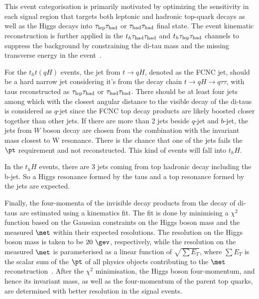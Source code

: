 This event categorisation is primarily motivated by optimizing the sensitivity in each signal region that targets both leptonic and hadronic top-quark
decays as well as the Higgs decays into $\tau_{\mathrm{lep}} \tau_{\mathrm{had}}$ or $\tau_{\mathrm{had}} \tau_{\mathrm{had}}$ final state.   
The event kinematic reconstruction is further applied in the $t_h\tau_{\mathrm{had}} \tau_{\mathrm{had}}$ and $t_h\tau_{\mathrm{lep}} \tau_{\mathrm{had}}$ channels to suppress the background by constraining the
di-tau mass and the missing transverse energy in the event~\cite{Chen:2015nta}. 

For the $t_ht(qH)$ events, the jet from $t\to qH$, denoted as the FCNC jet, should be a hard narrow jet considering it's from the
decay chain $t\to qH\to q\tau\tau$, with taus reconstructed as $\tau_{\mathrm{lep}} \tau_{\mathrm{had}}$ or $\tau_{\mathrm{had}} \tau_{\mathrm{had}}$.
There should be at least four jets among which with the closest angular distance to the visible decay of the di-taus
is considered as $q$-jet since the FCNC top decay products are likely boosted closer together than other jets. 
If there are more than 2 jets beside $q$-jet and $b$-jet, the jets from $W$ boson decay are chosen from the combination
with the invariant mass closest to W resonance. There is the chance that one of the jets fails the $\pt$ requirement and not reconstructed. This kind of events will fall
into $t_hH$.

In the $t_hH$ events, there are 3 jets coming from top hadronic decay including the b-jet. So a Higgs resonance formed by the taus and a top resonance formed by
the jets are expected.

Finally, the four-momenta of the invisible decay products from the decay of di-taus 
are estimated using a kinematics fit. The fit is done by minimising a $\chi^2$ function based on the Gaussian constraints on the Higgs boson mass and the
measured $\met$ within their expected resolutions. The resolution on the Higgs boson mass is taken to be $20~\gev$, respectively, while the resolution on the measured $\met$ is parameterised as a linear function of 
$\sqrt{\sum E_T}$, where $\sum E_T$ is the scalar sum of the $\pt$ of all physics objects contributing to the $\met$ reconstruction~\cite{Aaboud:2018tkc}.
After the $\chi^2$ minimisation, the Higgs boson four-momentum, and hence its invariant mass, as well as the 
four-momentum of the parent top quarks, are determined with better resolution in the signal events. 

